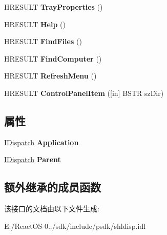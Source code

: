 \begin{DoxyCompactItemize}
$$H\+R\+E\+S\+U\+LT {\bfseries Tray\+Properties} ()
\item 
\mbox{\label{interface_shell32_1_1_i_shell_dispatch_a8c08eee093613f4677f5045452e843e9}} 
H\+R\+E\+S\+U\+LT {\bfseries Help} ()
\item 
\mbox{\label{interface_shell32_1_1_i_shell_dispatch_aeef40cf80ff50186568fb5830ed8d0b4}} 
H\+R\+E\+S\+U\+LT {\bfseries Find\+Files} ()
\item 
\mbox{\label{interface_shell32_1_1_i_shell_dispatch_aaf5e57cdb4c7576fddd8ea1791d43338}} 
H\+R\+E\+S\+U\+LT {\bfseries Find\+Computer} ()
\item 
\mbox{\label{interface_shell32_1_1_i_shell_dispatch_a5dcacc48ae2f6a5006fcf2d0242a2c77}} 
H\+R\+E\+S\+U\+LT {\bfseries Refresh\+Menu} ()
\item 
\mbox{\label{interface_shell32_1_1_i_shell_dispatch_a881a5c57dc2887479f3fae822f07b085}} 
H\+R\+E\+S\+U\+LT {\bfseries Control\+Panel\+Item} (\mbox{[}in\mbox{]} B\+S\+TR sz\+Dir)
\end{DoxyCompactItemize}
\subsection*{属性}
\begin{DoxyCompactItemize}
\item 
\mbox{\label{interface_shell32_1_1_i_shell_dispatch_ae7568f4ec334096e6bcec637fb253792}} 
\hyperlink{interface_i_dispatch}{I\+Dispatch} {\bfseries Application}
\item 
\mbox{\label{interface_shell32_1_1_i_shell_dispatch_a2ff53a522f53d036a8a9c2f1f6d50a6f}} 
\hyperlink{interface_i_dispatch}{I\+Dispatch} {\bfseries Parent}
\end{DoxyCompactItemize}
\subsection*{额外继承的成员函数}


该接口的文档由以下文件生成\+:\begin{DoxyCompactItemize}
\item 
E\+:/\+React\+O\+S-\/0../sdk/include/psdk/shldisp.\+idl\end{DoxyCompactItemize}
